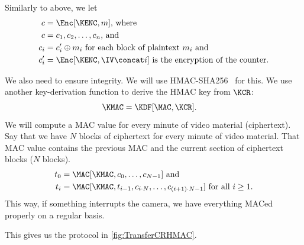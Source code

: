 Similarly to above, we let
\begin{align*}
  c &= \Enc[\KENC, m]\text{, where} \\
  c &= c_1, c_2, \ldots, c_n \text{, and} \\
  c_i &= c_i' \oplus m_i \text{ for each block of plaintext \(m_i\) and} \\
  c_i' &= \Enc[\KENC, \IV \concat i] \text{ is the encryption of the counter}.
\end{align*}

We also need to ensure integrity.
We will use HMAC-SHA256~\autocite{HMAC,shs} for this.
We use another key-derivation function to derive the HMAC key from \(\KCR\):
\begin{align*}
  \KMAC &= \KDF[\MAC, \KCR].
\end{align*}
We will compute a MAC value for every minute of video material (ciphertext).
Say that we have \(N\) blocks of ciphertext for every minute of video material.
That MAC value contains the previous MAC and the current section of ciphertext 
blocks (\(N\) blocks).
\begin{align*}
  t_0 &= \MAC[\KMAC, c_0, \ldots, c_{N-1}] \text{ and} \\
  t_i &= \MAC[\KMAC, t_{i-1}, c_{i\cdot N}, \ldots, c_{(i+1)\cdot N-1}]
  \text{ for all \(i\geq 1\)}.
\end{align*}
This way, if something interrupts the camera, we have everything MACed properly 
on a regular basis.

This gives us the protocol in \cref{fig:TransferCRHMAC}.

